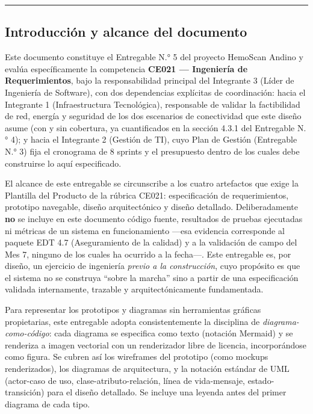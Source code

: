 \documentclass[11pt,a4paper]{article}
\begin{document}
\begin{center}\rule{0.5\linewidth}{0.5pt}\end{center}

\subsection{Introducción y alcance del documento}\label{introducciuxf3n-y-alcance-del-documento}

Este documento constituye el Entregable N.° 5 del proyecto HemoScan Andino y evalúa específicamente la competencia \textbf{CE021 --- Ingeniería de Requerimientos}, bajo la responsabilidad principal del Integrante 3 (Líder de Ingeniería de Software), con dos dependencias explícitas de coordinación: hacia el Integrante 1 (Infraestructura Tecnológica), responsable de validar la factibilidad de red, energía y seguridad de los dos escenarios de conectividad que este diseño asume (con y sin cobertura, ya cuantificados en la sección 4.3.1 del Entregable N.° 4); y hacia el Integrante 2 (Gestión de TI), cuyo Plan de Gestión (Entregable N.° 3) fija el cronograma de 8 sprints y el presupuesto dentro de los cuales debe construirse lo aquí especificado.

El alcance de este entregable se circunscribe a los cuatro artefactos que exige la Plantilla del Producto de la rúbrica CE021: especificación de requerimientos, prototipo navegable, diseño arquitectónico y diseño detallado. Deliberadamente \textbf{no} se incluye en este documento código fuente, resultados de pruebas ejecutadas ni métricas de un sistema en funcionamiento ---esa evidencia corresponde al paquete EDT 4.7 (Aseguramiento de la calidad) y a la validación de campo del Mes 7, ninguno de los cuales ha ocurrido a la fecha---. Este entregable es, por diseño, un ejercicio de ingeniería \emph{previo a la construcción}, cuyo propósito es que el sistema no se construya ``sobre la marcha'' sino a partir de una especificación validada internamente, trazable y arquitectónicamente fundamentada.

Para representar los prototipos y diagramas sin herramientas gráficas propietarias, este entregable adopta consistentemente la disciplina de \emph{diagrama-como-código}: cada diagrama se especifica como texto (notación Mermaid) y se renderiza a imagen vectorial con un renderizador libre de licencia, incorporándose como figura. Se cubren así los wireframes del prototipo (como mockups renderizados), los diagramas de arquitectura, y la notación estándar de UML (actor-caso de uso, clase-atributo-relación, línea de vida-mensaje, estado-transición) para el diseño detallado. Se incluye una leyenda antes del primer diagrama de cada tipo.
\end{document}
